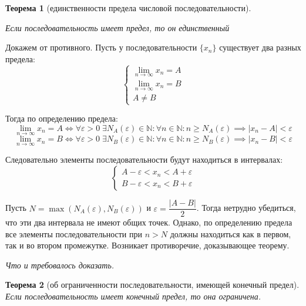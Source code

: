 \documentclass[a4paper,12pt,oneside]{extbook}
\newcommand{\newpar}{$ $\par\nobreak\ignorespaces}
\theoremstyle{numbered}
\theoremstyle{unnumbered}
\newtheorem*{theorem*}{Теорема}
\theoremstyle{named}
\theoremstyle{unnumbered}
\theoremstyle{named}
\theoremstyle{named}
\theoremstyle{named}
\renewenvironment{proof}[1][]{\breakenv[Доказательство]{\if\relax\detokenize{#1}\relax\else\;\fi}{\textbf{#1}}}{\smallskip\newpar \hfill\textit{Что и требовалось доказать.}}
\begin{document}
\begin{theorem*}[единственности предела числовой последовательности]
    \newpar
    Если последовательность имеет предел, то он единственный
\end{theorem*}

\begin{proof}
    Докажем от противного. Пусть у последовательности \(\{x_n\}\) существует два разных предела:
    \[
        \begin{cases}
            \displaystyle
            \lim_{n \to \infty}{x_n} = A \\
            \displaystyle
            \lim_{n \to \infty}{x_n} = B \\
            A \neq B
        \end{cases}
    \]

    Тогда по определению предела:
    \[
        \lim_{n \to \infty}{x_n} = A \iff
        \forall \varepsilon > 0 \; \exists N_{A}(\varepsilon) \in \mathbb{N}: \forall n \in \mathbb{N}: n \geq N_{A}(\varepsilon) \implies |x_n - A| < \varepsilon
    \]
    \[
        \lim_{n \to \infty}{x_n} = B \iff
        \forall \varepsilon > 0 \; \exists N_{B}(\varepsilon) \in \mathbb{N}: \forall n \in \mathbb{N}: n \geq N_{B}(\varepsilon) \implies |x_n - B| < \varepsilon
    \]

    Следовательно элементы последовательности будут находиться в интервалах:
    \[
        \begin{cases}
            A - \varepsilon < x_n < A + \varepsilon \\
            B - \varepsilon < x_n < B + \varepsilon
        \end{cases}
    \]

    Пусть \(N = \max(N_{A}(\varepsilon), N_{B}(\varepsilon))\) и \(\varepsilon = \dfrac{|A - B|}{2}\). Тогда нетрудно убедиться, что эти два интервала не имеют общих точек. Однако, по определению предела все элементы последовательности при \(n > N\) должны находиться как в первом, так и во втором промежутке. Возникает противоречие, доказывающее теорему.
\end{proof}

\begin{theorem*}[об ограниченности последовательности, имеющей конечный предел]
    Если последовательность имеет конечный предел, то она ограничена.
\end{theorem*}
\end{document}
